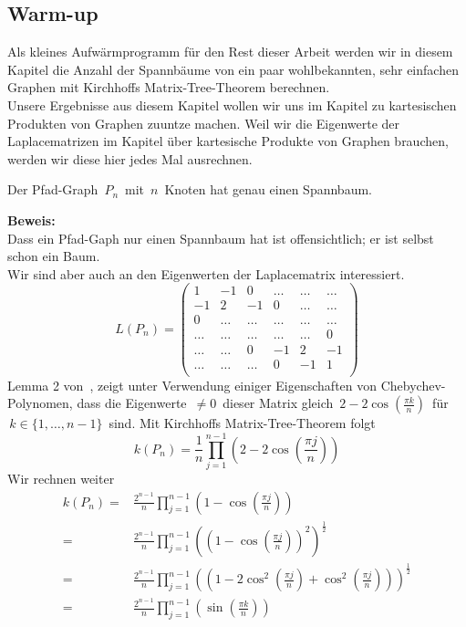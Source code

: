 \subsection{Warm-up}
Als kleines Aufwärmprogramm für den Rest dieser Arbeit werden wir in diesem Kapitel die Anzahl der Spannbäume von ein paar wohlbekannten, sehr einfachen Graphen mit Kirchhoffs Matrix-Tree-Theorem berechnen.\\
Unsere Ergebnisse aus diesem Kapitel wollen wir uns im Kapitel zu kartesischen Produkten von Graphen zuuntze machen. Weil wir die Eigenwerte der Laplacematrizen im Kapitel über kartesische Produkte von Graphen brauchen, werden wir diese hier jedes Mal ausrechnen.\\
\begin{Lms}
 Der Pfad-Graph $\,P_n\,$ mit $\,n\,$ Knoten hat genau einen Spannbaum.
\end{Lms}
\textbf{Beweis:}\\
Dass ein Pfad-Gaph nur einen Spannbaum hat ist offensichtlich; er ist selbst schon ein Baum.\\
Wir sind aber auch an den Eigenwerten der Laplacematrix interessiert.\\
\begin{equation}
L(P_n)=
\begin{pmatrix}
1&-1&0&\ldots&\ldots&\ldots\\
-1&2&-1&0&\ldots&\ldots\\
0&\ldots&\ldots&\ldots&\ldots&\ldots\\
\ldots&\ldots&\ldots&\ldots&\ldots&0\\
\ldots&\ldots&0&-1&2&-1\\
\ldots&\ldots&\ldots&0&-1&1\\
\end{pmatrix}
\end{equation}
Lemma 2 von~\cite{daoud_2014}, zeigt unter Verwendung einiger Eigenschaften von Chebychev-Polynomen, dass die Eigenwerte $\,\neq 0\,$ dieser Matrix gleich $\,2-2\cos \left(\frac{\pi k}{n}\right)\,$ für $\,k \in \{1,\ldots,n-1\}\,$ sind.
Mit Kirchhoffs Matrix-Tree-Theorem folgt
\begin{equation}
 \mathit{k}(P_n)=\frac{1}{n}\prod_{j=1}^{n-1} \left(2-2\cos \left(\frac{\pi j}{n}\right)\right)
\end{equation}
Wir rechnen weiter
\begin{equation}
\begin{split}
 \mathit{k}(P_n)={} & \frac{2^{n-1}}{n}\prod_{j=1}^{n-1} \left(1-\cos \left(\frac{\pi j}{n}\right)\right) \\
  ={}& \frac{2^{n-1}}{n}\prod_{j=1}^{n-1} \left(\left(1-\cos \left(\frac{\pi j}{n}\right)\right)^2\right)^{\frac{1}{2}} \\
  ={}&\frac{2^{n-1}}{n}\prod_{j=1}^{n-1} \left(\left(1-2\cos^2 \left(\frac{\pi j}{n}\right)+\cos^2 \left(\frac{\pi j}{n}\right)\right)\right)^{\frac{1}{2}} \\
  ={}& \frac{2^{n-1}}{n}\prod_{j=1}^{n-1} \left(\sin\left(\frac{\pi k}{n}\right) \right)
  \end{split}
\end{equation}
